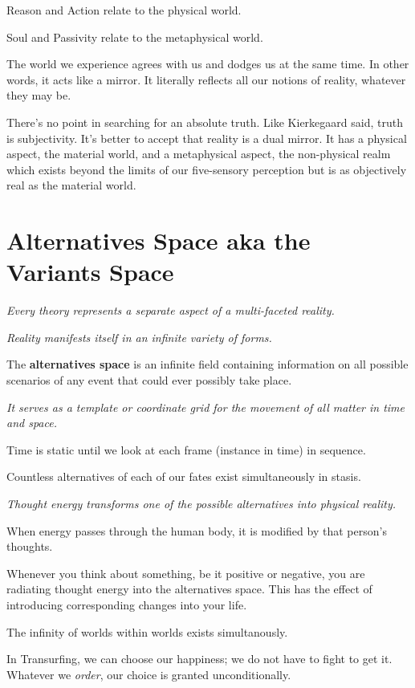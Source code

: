 \documentclass[
  openany]{book}
\begin{document}
Reason and Action relate to the physical world.

Soul and Passivity relate to the metaphysical world.

The world we experience agrees with us and dodges us at the same time. In other words, it acts like a mirror. It literally reflects all our notions of reality, whatever they may be.

There's no point in searching for an absolute truth. Like Kierkegaard said, truth is subjectivity. It's better to accept that reality is a dual mirror. It has a physical aspect, the material world, and a metaphysical aspect, the non-physical realm which exists beyond the limits of our five-sensory perception but is as objectively real as the material world.

\hypertarget{alternatives-space-aka-the-variants-space}{%
\chapter{Alternatives Space aka the Variants Space}\label{alternatives-space-aka-the-variants-space}}

\emph{Every theory represents a separate aspect of a multi-faceted reality.}

\emph{Reality manifests itself in an infinite variety of forms.}

The \textbf{alternatives space} is an infinite field containing information on all possible scenarios of any event that could ever possibly take place.

\emph{It serves as a template or coordinate grid for the movement of all matter in time and space.}

Time is static until we look at each frame (instance in time) in sequence.

Countless alternatives of each of our fates exist simultaneously in stasis.

\emph{Thought energy transforms one of the possible alternatives into physical reality.}

When energy passes through the human body, it is modified by that person's thoughts.

Whenever you think about something, be it positive or negative, you are radiating thought energy into the alternatives space. This has the effect of introducing corresponding changes into your life.

The infinity of worlds within worlds exists simultanously.

In Transurfing, we can choose our happiness; we do not have to fight to get it. Whatever we \emph{order}, our choice is granted unconditionally.
\end{document}

